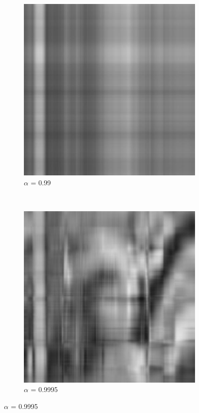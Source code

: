 \documentclass{report}
\begin{document}
			\begin{figure}[H]
        		\begin{center}
        			\begin{subfigure}{0.5\textwidth}
		                \includegraphics[width=\textwidth]{sources/Q5_99.jpg}
                		\caption{$\alpha$ = 0.99}
        			\end{subfigure}%
        			~
    	    		\begin{subfigure}{0.5\textwidth}
	                	\includegraphics[width=\textwidth]{sources/Q5_9995.jpg}
		                \caption{$\alpha$ = 0.9995}
        			\end{subfigure}


\end{center}
\end{figure}
\end{document}
